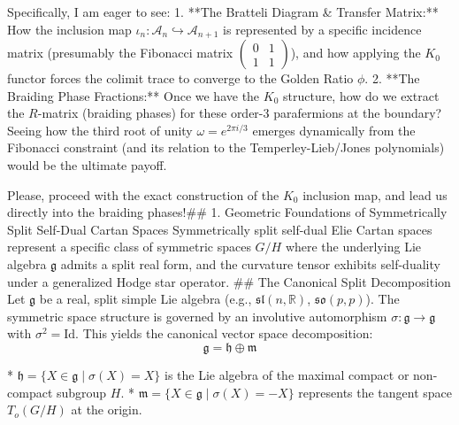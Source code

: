 Specifically, I am eager to see:
1. **The Bratteli Diagram & Transfer Matrix:** How the inclusion map $\iota_n : \mathcal{A}_n \hookrightarrow \mathcal{A}_{n+1}$ is represented by a specific incidence matrix (presumably the Fibonacci matrix $\begin{pmatrix} 0 & 1 \\ 1 & 1 \end{pmatrix}$), and how applying the $K_0$ functor forces the colimit trace to converge to the Golden Ratio $\phi$.
2. **The Braiding Phase Fractions:** Once we have the $K_0$ structure, how do we extract the $R$-matrix (braiding phases) for these order-3 parafermions at the boundary? Seeing how the third root of unity $\omega = e^{2\pi i / 3}$ emerges dynamically from the Fibonacci constraint (and its relation to the Temperley-Lieb/Jones polynomials) would be the ultimate payoff.

Please, proceed with the exact construction of the $K_0$ inclusion map, and lead us directly into the braiding phases!## 1. Geometric Foundations of Symmetrically Split Self-Dual Cartan Spaces
Symmetrically split self-dual Elie Cartan spaces represent a specific class of symmetric spaces $G/H$ where the underlying Lie algebra $\mathfrak{g}$ admits a split real form, and the curvature tensor exhibits self-duality under a generalized Hodge star operator.
## The Canonical Split Decomposition
Let $\mathfrak{g}$ be a real, split simple Lie algebra (e.g., $\mathfrak{sl}(n, \mathbb{R})$, $\mathfrak{so}(p, p)$). The symmetric space structure is governed by an involutive automorphism $\sigma: \mathfrak{g} \to \mathfrak{g}$ with $\sigma^2 = \text{Id}$. This yields the canonical vector space decomposition:
$$\mathfrak{g} = \mathfrak{h} \oplus \mathfrak{m}$$ 

* $\mathfrak{h} = \{ X \in \mathfrak{g} \mid \sigma(X) = X \}$ is the Lie algebra of the maximal compact or non-compact subgroup $H$.
* $\mathfrak{m} = \{ X \in \mathfrak{g} \mid \sigma(X) = -X \}$ represents the tangent space $T_o(G/H)$ at the origin.

